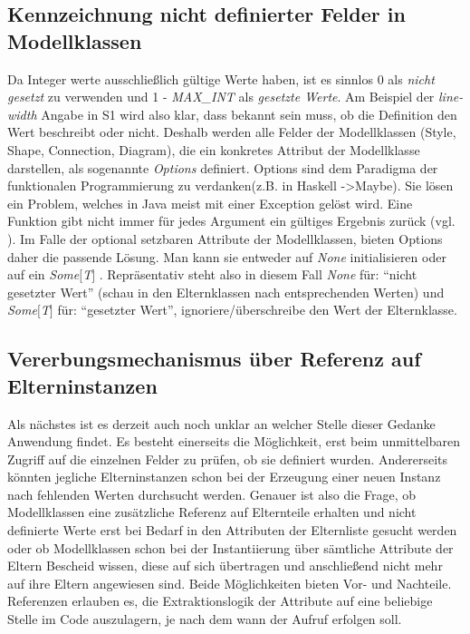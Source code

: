 \subsection{Kennzeichnung nicht definierter Felder in Modellklassen}
Da Integer werte ausschließlich gültige Werte haben, ist es sinnlos 0 als \textit{nicht gesetzt} zu verwenden und 1 - \textit{MAX\_INT} als \textit{gesetzte Werte}. Am Beispiel der \textit{line-width} Angabe in S1 wird also klar, dass bekannt sein muss, ob die Definition den Wert beschreibt oder nicht. 
Deshalb werden alle Felder der Modellklassen (Style, Shape, Connection, Diagram), die ein konkretes Attribut der Modellklasse darstellen, als sogenannte \textit{Options} definiert. Options sind dem Paradigma der funktionalen Programmierung zu verdanken(z.B. in Haskell -\textgreater Maybe).
Sie lösen ein Problem, welches in Java meist mit einer Exception gelöst wird.
Eine Funktion gibt nicht immer für jedes Argument ein gültiges Ergebnis zurück (vgl. ). Im Falle der optional setzbaren Attribute der Modellklassen, bieten Options daher die passende Lösung. Man kann sie entweder auf \textit{None} initialisieren oder auf ein \textit{Some$[$T$]$ }. Repräsentativ steht also in diesem Fall \textit{None} für: "`nicht gesetzter Wert"' (schau in den Elternklassen nach entsprechenden Werten) und \textit{Some$[$T$]$} für: "`gesetzter Wert"', ignoriere/überschreibe den Wert der Elternklasse.
\subsection{Vererbungsmechanismus über Referenz auf Elterninstanzen}
Als nächstes ist es derzeit auch noch unklar an welcher Stelle dieser Gedanke Anwendung findet. Es besteht einerseits die Möglichkeit, erst beim unmittelbaren Zugriff auf die einzelnen Felder zu prüfen, ob sie definiert wurden. Andererseits könnten jegliche Elterninstanzen schon bei der Erzeugung einer neuen Instanz nach fehlenden Werten durchsucht werden. Genauer ist also die Frage, ob Modellklassen eine zusätzliche Referenz auf Elternteile erhalten und nicht definierte Werte erst bei Bedarf in den Attributen der Elternliste gesucht werden oder ob Modellklassen schon bei der Instantiierung über sämtliche Attribute der Eltern Bescheid wissen, diese auf sich übertragen und anschließend nicht mehr auf ihre Eltern angewiesen sind. Beide Möglichkeiten bieten Vor- und Nachteile. Referenzen erlauben es, die Extraktionslogik der Attribute auf eine beliebige Stelle im Code auszulagern, je nach dem wann der Aufruf erfolgen soll. 
